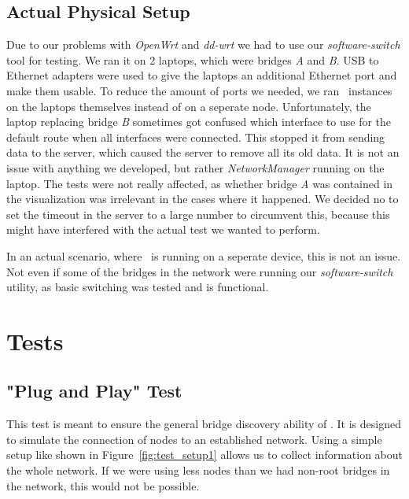 \subsection*{Actual Physical Setup}
\label{physical_setup}
Due to our problems with \textit{OpenWrt} and \textit{dd-wrt} we had to use our \textit{software-switch} tool for testing.
We ran it on 2 laptops, which were bridges \textit{A} and \textit{B}.
USB to Ethernet adapters were used to give the laptops an additional Ethernet port and make them usable.
To reduce the amount of ports we needed, we ran \tool\ instances on the laptops themselves instead of on a seperate node.
Unfortunately, the laptop replacing bridge \textit{B} sometimes got confused which interface to use for the default route when all interfaces were connected.
This stopped it from sending data to the server, which caused the server to remove all its old data.
It is not an issue with anything we developed, but rather \textit{NetworkManager} running on the laptop.
The tests were not really affected, as whether bridge \textit{A} was contained in the visualization was irrelevant in the cases where it happened.
We decided no to set the timeout in the server to a large number to circumvent this, because this might have interfered with the actual test we wanted to perform.

In an actual scenario, where \tool\ is running on a seperate device, this is not an issue.
Not even if some of the bridges in the network were running our \textit{software-switch} utility, as basic switching was tested and is functional.

\section{Tests}
\subsection*{"Plug and Play" Test}
\label{usage_test}
This test is meant to ensure the general bridge discovery ability of \tool.
It is designed to simulate the connection of nodes to an established network.
Using a simple setup like shown in Figure~\ref{fig:test_setup1} allows us to collect information about the whole network.
If we were using less nodes than we had non-root bridges in the network, this would not be possible.


